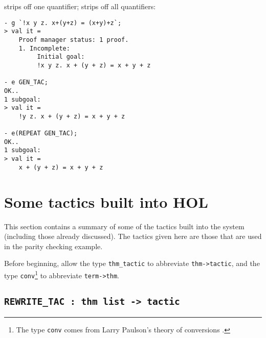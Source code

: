 \noindent {} strips off one quantifier;
 strips off all quantifiers:

\begin{session}\begin{verbatim}
- g `!x y z. x+(y+z) = (x+y)+z`;
> val it =
    Proof manager status: 1 proof.
    1. Incomplete:
         Initial goal:
         !x y z. x + (y + z) = x + y + z

- e GEN_TAC;
OK..
1 subgoal:
> val it =
    !y z. x + (y + z) = x + y + z

- e(REPEAT GEN_TAC);
OK..
1 subgoal:
> val it =
    x + (y + z) = x + y + z
\end{verbatim}\end{session}

\section{Some tactics built into HOL}

This section contains a summary of some of the tactics built into the
\HOL{} system (including those already discussed).  The tactics given
here are those that are used in the parity checking example.

Before beginning, allow the \ML{} type {\small\verb|thm_tactic|} to
abbreviate {\small\verb|thm->tactic|}, and the type
{\small\verb|conv|}\footnote{The type {\small{\tt conv}} comes from
  Larry Paulson's theory of conversions \cite{lcp_rewrite}.}  to
abbreviate {\small\verb|term->thm|}.

\subsection{\tt REWRITE\_TAC : thm list -> tactic}
\label{rewrite}

